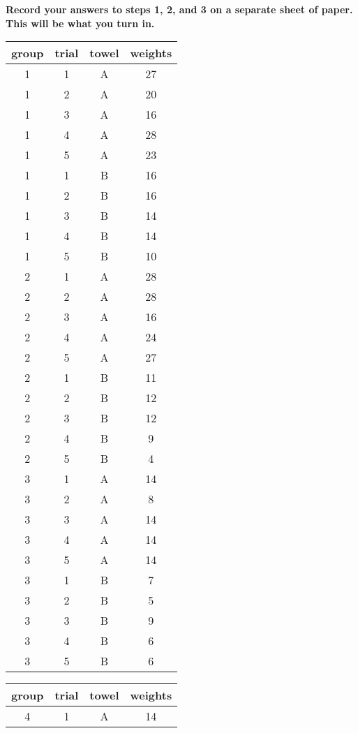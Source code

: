 \documentclass[12pt]{article}
\begin{document}
\textbf{Record your answers to steps 1, 2, and 3 on a separate sheet of paper. This will be what you turn in.}

\begin{table}[ht]
\centering
\begin{tabular}{cccc}
  \hline
group & trial & towel & weights \\ 
  \hline
  1 &   1 & A &  27 \\ 
    1 &   2 & A &  20 \\ 
    1 &   3 & A &  16 \\ 
    1 &   4 & A &  28 \\ 
    1 &   5 & A &  23 \\ 
    1 &   1 & B &  16 \\ 
    1 &   2 & B &  16 \\ 
    1 &   3 & B &  14 \\ 
    1 &   4 & B &  14 \\ 
    1 &   5 & B &  10 \\ 
    2 &   1 & A &  28 \\ 
    2 &   2 & A &  28 \\ 
    2 &   3 & A &  16 \\ 
    2 &   4 & A &  24 \\ 
    2 &   5 & A &  27 \\ 
    2 &   1 & B &  11 \\ 
    2 &   2 & B &  12 \\ 
    2 &   3 & B &  12 \\ 
    2 &   4 & B &   9 \\ 
    2 &   5 & B &   4 \\ 
    3 &   1 & A &  14 \\ 
    3 &   2 & A &   8 \\ 
    3 &   3 & A &  14 \\ 
    3 &   4 & A &  14 \\ 
    3 &   5 & A &  14 \\ 
    3 &   1 & B &   7 \\ 
    3 &   2 & B &   5 \\ 
    3 &   3 & B &   9 \\ 
    3 &   4 & B &   6 \\ 
    3 &   5 & B &   6 \\ 
   \hline
\end{tabular}
\quad
\begin{tabular}{cccc}
  \hline
group & trial & towel & weights \\ 
  \hline
    4 &   1 & A &  14 \\ 

\end{tabular}
\end{table}
\end{document}

